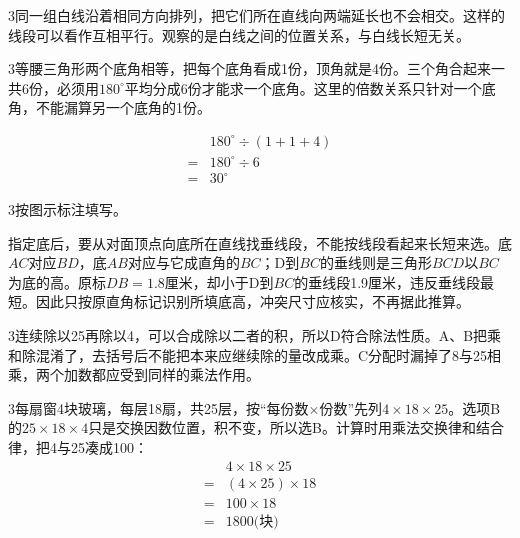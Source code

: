 \documentclass[multi=snippet,border={5bp 20bp 5bp 5bp}]{standalone}
\newenvironment{snippet}[3]{\begin{minipage}{#1bp}\color{answerred}\fontsize{#2}{#3}\selectfont\raggedright}{\end{minipage}}
\begin{document}
\begin{snippet}{505}{11.5}{14}\begin{multicols}{3}\raggedcolumns 同一组白线沿着相同方向排列，把它们所在直线向两端延长也不会相交。这样的线段可以看作互相平行。观察的是白线之间的位置关系，与白线长短无关。\end{multicols}\end{snippet}
\begin{snippet}{505}{11.5}{14}\begin{multicols}{3}\raggedcolumns 等腰三角形两个底角相等，把每个底角看成1份，顶角就是4份。三个角合起来一共6份，必须用\(180^\circ\)\allowbreak 平均分成6份才能求一个底角。这里的倍数关系只针对一个底角，不能漏算另一个底角的1份。\par \[\begin{aligned}&180^\circ\div(1+1+4)\\={}&180^\circ\div6\\={}&30^\circ\end{aligned}\]\end{multicols}\end{snippet}
\begin{snippet}{505}{11.5}{14}\begin{multicols}{3}\raggedcolumns 按图示标注填写。\par 指定底后，要从对面顶点向底所在直线找垂线段，不能按线段看起来长短来选。底\(AC\)\allowbreak 对应\(BD\)\allowbreak ，底\(AB\)\allowbreak 对应与它成直角的\(BC\)\allowbreak ；D到\(BC\)\allowbreak 的垂线则是三角形\(BCD\)\allowbreak 以\(BC\)\allowbreak 为底的高。原标\(DB=1.8\)\allowbreak 厘米，却小于D到\(BC\)\allowbreak 的垂线段1.9厘米，违反垂线段最短。因此只按原直角标记识别所填底高，冲突尺寸应核实，不再据此推算。\end{multicols}\end{snippet}
\begin{snippet}{505}{11.5}{14}\begin{multicols}{3}\raggedcolumns 连续除以25再除以4，可以合成除以二者的积，所以D符合除法性质。A、B把乘和除混淆了，去括号后不能把本来应继续除的量改成乘。C分配时漏掉了8与25相乘，两个加数都应受到同样的乘法作用。\end{multicols}\end{snippet}
\begin{snippet}{505}{11.5}{14}\begin{multicols}{3}\raggedcolumns 每扇窗4块玻璃，每层18扇，共25层，按“每份数\(\times\)\allowbreak 份数”先列\(4\times18\times25\)\allowbreak 。选项B的\(25\times18\times4\)\allowbreak 只是交换因数位置，积不变，所以选B。计算时用乘法交换律和结合律，把4与25凑成100：\[\begin{aligned}&4\times18\times25\\={}&(4\times25)\times18\\={}&100\times18\\={}&1800\text{(块)}\end{aligned}\]\end{multicols}\end{snippet}
\end{document}
